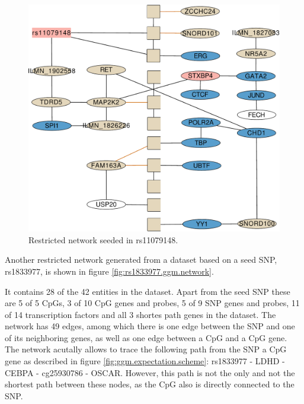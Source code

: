 \documentclass[a4paper,12pt,twoside,openright]{report}
\begin{document}
\begin{figure}[tb]
	\includegraphics[scale = 0.2, keepaspectratio = true]{"../figures/rs11079148"}  
	\caption{Restricted network seeded in rs11079148. }
    \label{fig:rs11079148.ggm.network}
\end{figure}

Another restricted network generated from a dataset based on a seed SNP, rs1833977, is shown in figure \ref{fig:rs1833977.ggm.network}. 

It contains 28 of the 42 entities in the dataset. Apart from the seed SNP these are 5 of 5 CpGs, 3 of 10 CpG genes and probes, 5 of 9 SNP genes and probes, 11 of 14 transcription factors and all 3 shortes path genes in the dataset. The network has 49 edges, among which there is one edge between the SNP and one of its neighboring genes, as well as one edge between a CpG and a CpG gene. The network acutally allows to trace the following path from the SNP a CpG gene as described in figure \ref{fig:ggm.expectation.scheme}: rs1833977 - LDHD - CEBPA - cg25930786 - OSCAR. However, this path is not the only and not the shortest path between these nodes, as the CpG also is directly connected to the SNP. 
\end{document}
